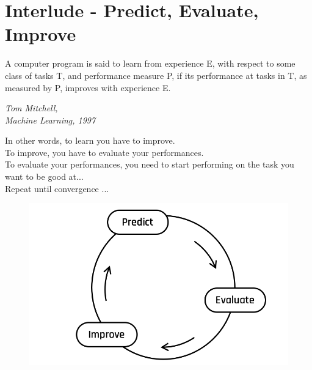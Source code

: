 
\section*{Interlude - Predict, Evaluate, Improve}

\epigraph
{A computer program is said to learn from experience E, with respect to some
class of tasks T, and performance measure P, if its performance at tasks in T,
as measured by P, improves with experience E.}{\textit{Tom Mitchell,\\Machine Learning, 1997}}

\begin{quote}{}

\end{quote}

In other words, to learn you have to improve.\\
To improve, you have to evaluate your performances.\\
To evaluate your performances, you need to start performing on the task you want to be good at...\\
Repeat until convergence ...\\

\begin{figure}[h!]
  \centering
  \includegraphics[scale=0.25]{assets/Default.png}
\end{figure}

